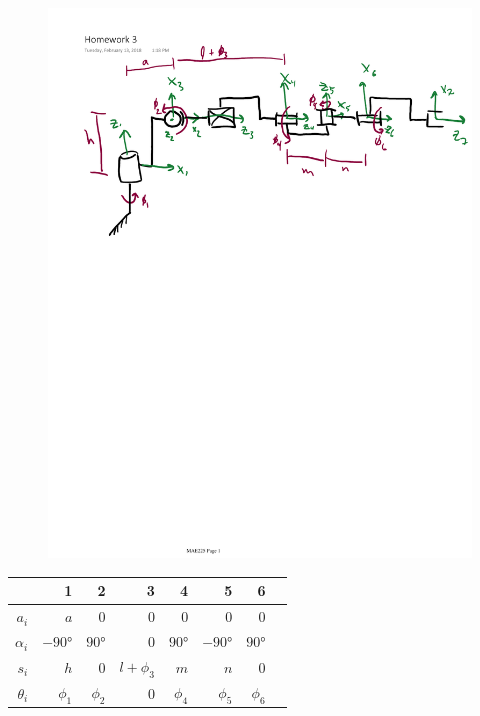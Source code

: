 \documentclass[onecolumn,10pt]{jhwhw}
\begin{document}
\begin{figure}[h!]
  \centering
  \includegraphics[width=\linewidth]{homework3-diagram.pdf}
\end{figure}

\begin{center}
\begin{tabular}{r|rrrrrrr}
           & 1          & 2          & 3            & 4          & 5           & 6          \\
\midrule
$a_i$      & $a$        & 0          & 0            & 0          & 0           & 0          \\
$\alpha_i$ & $-\ang{90}$ & $\ang{90}$ & 0            & $\ang{90}$ & $\ang{-90}$ & $\ang{90}$ \\
$s_i$      & $h$        & 0          & $l + \phi_3$ & $m$        & $n$         & 0          \\
$\theta_i$ & $\phi_1$   & $\phi_2$   & 0            & $\phi_4$   & $\phi_5$    & $\phi_6$   \\
\end{tabular}
\end{center}
\end{document}
